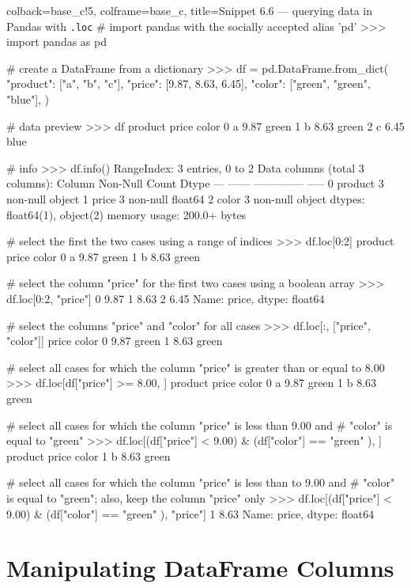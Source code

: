 \documentclass[a4paper,11pt]{book}
\begin{document}
\begin{pythoncode}[linenos=True]{colback=base_c!5, colframe=base_c, title=\sffamily Snippet 6.6 --- querying data in Pandas with \texttt{.loc}}
# import pandas with the socially accepted alias 'pd'
>>> import pandas as pd

# create a DataFrame from a dictionary
>>> df = pd.DataFrame.from_dict(
        {
            "product": ["a", "b", "c"],
            "price": [9.87, 8.63, 6.45],
            "color": ["green", "green", "blue"],
        }
    )

# data preview
>>> df
  product  price  color
0       a   9.87  green
1       b   8.63  green
2       c   6.45   blue

# info 
>>> df.info()
RangeIndex: 3 entries, 0 to 2
Data columns (total 3 columns):
     Column   Non-Null Count  Dtype  
---  ------   --------------  -----  
 0   product  3 non-null      object 
 1   price    3 non-null      float64
 2   color   3 non-null      object 
dtypes: float64(1), object(2)
memory usage: 200.0+ bytes

# select the first the two cases using a range of indices
>>> df.loc[0:2]
      product  price  color
    0       a   9.87  green
    1       b   8.63  green

# select the column "price" for the first two cases using a boolean array
>>> df.loc[0:2, "price"]
0    9.87
1    8.63
2    6.45
Name: price, dtype: float64

# select the columns "price" and "color" for all cases
>>> df.loc[:, ["price", "color"]]
   price  color
0   9.87  green
1   8.63  green

# select all cases for which the column "price" is greater than or equal to 8.00
>>> df.loc[df["price"] >= 8.00, ]
  product  price  color
0       a   9.87  green
1       b   8.63  green

# select all cases for which the column "price" is less than 9.00 and 
# "color" is equal to "green"
>>> df.loc[(df["price"] < 9.00) & (df["color"] == "green" ), ]
  product  price  color
1       b   8.63  green

# select all cases for which the column "price" is less than to 9.00 and 
# "color" is equal to "green"; also, keep the column "price" only
>>> df.loc[(df["price"] < 9.00) & (df["color"] == "green" ), "price"]
1    8.63
Name: price, dtype: float64
\end{pythoncode}

\section{Manipulating DataFrame Columns}
\label{sec:manipulating_df_columns}
\end{document}
